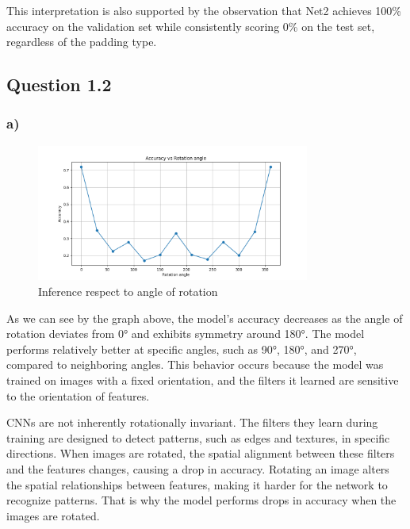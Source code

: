 \documentclass{article}
\begin{document}
This interpretation is also supported by the observation that Net2 achieves 100\% accuracy on the validation set while
consistently scoring 0\% on the test set, regardless of the padding type.

\subsection*{Question 1.2}

\subsubsection*{a)}

\begin{figure}[H]
    \centering
    \includegraphics[width=0.8\textwidth]{images/rot_angles.png}
    \caption{Inference respect to angle of rotation}
    \label{fig:angle_inference}
\end{figure}

As we can see by the graph above, the model's accuracy decreases as the angle of rotation deviates from 0°
and exhibits symmetry around 180°. The model performs relatively better at specific angles, such as 90°, 180°, and 270°,
compared to neighboring angles. This behavior occurs because the model was trained on images with a fixed orientation,
and the filters it learned are sensitive to the orientation of features.

CNNs are not inherently rotationally invariant. The filters they learn during training are designed to detect patterns,
such as edges and textures, in specific directions. When images are rotated, the spatial alignment between these filters
and the features changes, causing a drop in accuracy. Rotating an image alters the spatial relationships between features,
making it harder for the network to recognize patterns. That is why the model performs drops in accuracy when the images are rotated.
\end{document}
